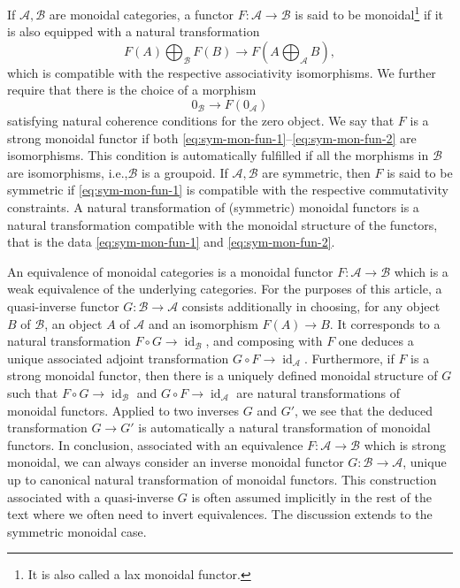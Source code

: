 \documentclass[11pt]{article}
\newcommand{\ie}{i.e.,\xspace}
\theoremstyle{plain}
\theoremstyle{definition}
\newcommand{\Acal}{\mathcal A}
\newcommand{\Bcal}{\mathcal B}
\DeclareMathOperator{\id}{id}
\begin{document}
If $\Acal, \Bcal$ are monoidal categories, a functor $F\colon\Acal\to\Bcal$ is said to be monoidal\footnote{It is also called a lax monoidal functor.} if it is also equipped with a natural transformation
\begin{equation}\label{eq:sym-mon-fun-1}
F(A) \bigoplus_{\Bcal} F(B) \to F(A \bigoplus_\Acal B),
\end{equation}
which is compatible with the respective associativity isomorphisms. We further require that there is the choice of a morphism
\begin{equation}\label{eq:sym-mon-fun-2}
0_\Bcal \to F(0_\Acal)
\end{equation}
satisfying natural coherence conditions for the zero object. We say that $F$ is a strong monoidal functor if both \eqref{eq:sym-mon-fun-1}--\eqref{eq:sym-mon-fun-2} are isomorphisms. This condition is automatically fulfilled if all the morphisms in $\Bcal$ are isomorphisms, \ie $\Bcal$ is a groupoid. If $\Acal, \Bcal$ are symmetric, then $F$ is said to be symmetric if \eqref{eq:sym-mon-fun-1} is compatible with the respective commutativity constraints. A natural transformation of (symmetric) monoidal functors is a natural transformation compatible with the monoidal structure of the functors, that is the data \eqref{eq:sym-mon-fun-1} and \eqref{eq:sym-mon-fun-2}.

An equivalence of monoidal categories is a monoidal functor $F\colon \Acal\to \Bcal$ which is a weak equivalence of the underlying categories. For the purposes of this article, a quasi-inverse functor $G \colon \Bcal \to \Acal$ consists additionally in choosing, for any object $B$ of $\Bcal$, an object $A$ of $\Acal$ and an isomorphism $F(A)\to B$. It corresponds to a natural transformation $F \circ G \to \id_{\Bcal}$, and composing with $F$ one deduces a unique associated adjoint transformation $G \circ F \to \id_{\Acal}$. Furthermore, if $F$ is a strong monoidal functor, then there is a uniquely defined monoidal structure of $G$ such that $F \circ G \to \id_{\Bcal}$ and $G \circ F \to \id_{\Acal}$ are natural transformations of monoidal functors. Applied to two inverses $G$ and $G'$, we see that the deduced transformation $G \to G'$ is automatically a natural transformation of monoidal functors. In conclusion, associated with an equivalence $F \colon \Acal \to \Bcal$ which is strong monoidal, we can always consider an inverse monoidal functor $G \colon \Bcal \to \Acal$, unique up to canonical natural transformation of monoidal functors. This construction associated with a quasi-inverse $G$ is often assumed implicitly in the rest of the text where we often need to invert equivalences. The discussion extends to the symmetric monoidal case.
\end{document}
